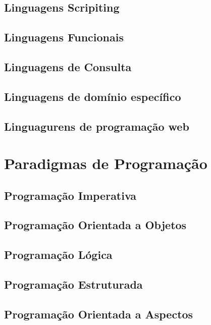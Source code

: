 \documentclass[tcc/ec]{faeng}
\begin{document}
\subsection{Linguagens Scripiting}

\subsection{Linguagens Funcionais}

\subsection{Linguagens de Consulta}

\subsection{Linguagens de domínio específico}

\subsection{Linguagurens de programação web}

\section{Paradigmas de Programação}

\subsection{Programação Imperativa}

\subsection{Programação Orientada a Objetos}

\subsection{Programação Lógica}

\subsection{Programação Estruturada}

\subsection{Programação Orientada a Aspectos}
\end{document}
